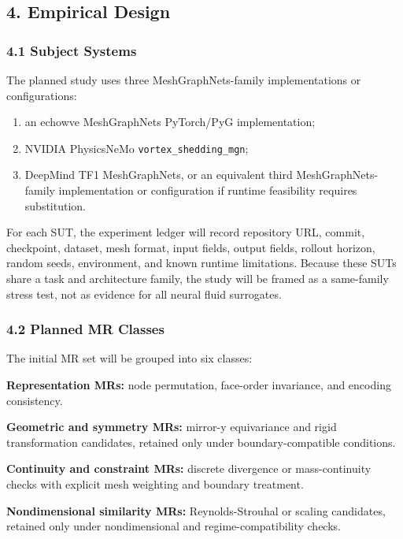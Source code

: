\subsection{4. Empirical Design}\label{empirical-design}

\subsubsection{4.1 Subject Systems}\label{subject-systems}

The planned study uses three MeshGraphNets-family implementations or
configurations:

\begin{enumerate}
\def\labelenumi{\arabic{enumi}.}
\tightlist
\item
  an echowve MeshGraphNets PyTorch/PyG implementation;
\item
  NVIDIA PhysicsNeMo \texttt{vortex\_shedding\_mgn};
\item
  DeepMind TF1 MeshGraphNets, or an equivalent third
  MeshGraphNets-family implementation or configuration if runtime
  feasibility requires substitution.
\end{enumerate}

For each SUT, the experiment ledger will record repository URL, commit,
checkpoint, dataset, mesh format, input fields, output fields, rollout
horizon, random seeds, environment, and known runtime limitations.
Because these SUTs share a task and architecture family, the study will
be framed as a same-family stress test, not as evidence for all neural
fluid surrogates.

\subsubsection{4.2 Planned MR Classes}\label{planned-mr-classes}

The initial MR set will be grouped into six classes:

\textbf{Representation MRs:} node permutation, face-order invariance,
and encoding consistency.

\textbf{Geometric and symmetry MRs:} mirror-y equivariance and rigid
transformation candidates, retained only under boundary-compatible
conditions.

\textbf{Continuity and constraint MRs:} discrete divergence or
mass-continuity checks with explicit mesh weighting and boundary
treatment.

\textbf{Nondimensional similarity MRs:} Reynolds-Strouhal or scaling
candidates, retained only under nondimensional and regime-compatibility
checks.

